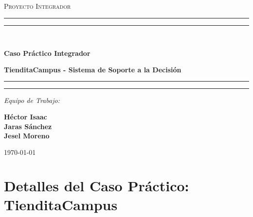 \documentclass[12pt,a4paper]{article}
\begin{document}
\begin{titlepage}
    \centering
    \vspace*{2cm}
    
    {\scshape\LARGE Proyecto Integrador \par}
    \vspace{1.5cm}
    
    \rule{\textwidth}{0.4pt}\vspace*{-\baselineskip}\vspace{3.2pt}
    \rule{\textwidth}{1.6pt}\\[\baselineskip]
    {\huge \bfseries Caso Práctico Integrador \par}
    \vspace{0.2cm}
    {\Large \bfseries TienditaCampus - Sistema de Soporte a la Decisión\par}
    \vspace{0.4cm}
    \rule{\textwidth}{1.6pt}\vspace*{-\baselineskip}\vspace{3.2pt}
    \rule{\textwidth}{0.4pt}
    
    \vspace{2cm}
    
    {\Large\itshape Equipo de Trabajo:\par}
    \vspace{0.8cm}
    {\Large 
        \textbf{Héctor Isaac}\\[0.4cm]
        \textbf{Jaras Sánchez}\\[0.4cm]
        \textbf{Jesel Moreno}
    \par}
    \vfill
    
    {\large \today\par}
\end{titlepage}

\newpage

\section*{Detalles del Caso Práctico: TienditaCampus}
\vspace{0.5cm}
\end{document}

